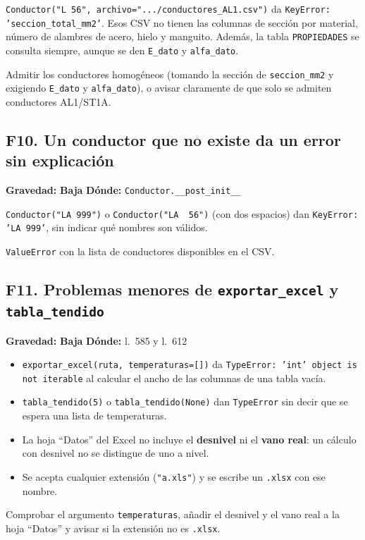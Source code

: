 \documentclass[11pt,a4paper]{article}
\newcommand{\baja}{\textcolor{baja}{\textbf{Baja}}}
\newcommand{\code}[1]{\texttt{#1}}
\newcommand{\fallo}[4]{%
  \subsection[#1. #2]{#1. #2}
  \noindent\textbf{Gravedad:} #3 \quad \textbf{Dónde:} #4\par\medskip}
\begin{document}
\code{Conductor("L 56", archivo=".../conductores\_AL1.csv")} da \code{KeyError: 'seccion\_total\_mm2'}. Esos CSV no tienen las columnas de sección por material, número de alambres de acero, hielo y manguito. Además, la tabla \code{PROPIEDADES} se consulta siempre, aunque se den \code{E\_dato} y \code{alfa\_dato}.

\begin{arreglo}
Admitir los conductores homogéneos (tomando la sección de \code{seccion\_mm2} y exigiendo \code{E\_dato} y \code{alfa\_dato}), o avisar claramente de que solo se admiten conductores AL1/ST1A.
\end{arreglo}

\fallo{F10}{Un conductor que no existe da un error sin explicación}{\baja}{\code{Conductor.\_\_post\_init\_\_}}

\code{Conductor("LA 999")} o \code{Conductor("LA~~56")} (con dos espacios) dan \code{KeyError: 'LA 999'}, sin indicar qué nombres son válidos.

\begin{arreglo}
\code{ValueError} con la lista de conductores disponibles en el CSV.
\end{arreglo}

\fallo{F11}{Problemas menores de \code{exportar\_excel} y \code{tabla\_tendido}}{\baja}{l.~585 y l.~612}

\begin{itemize}[leftmargin=1.5em]
  \item \code{exportar\_excel(ruta, temperaturas=[])} da \code{TypeError: 'int' object is not iterable} al calcular el ancho de las columnas de una tabla vacía.
  \item \code{tabla\_tendido(5)} o \code{tabla\_tendido(None)} dan \code{TypeError} sin decir que se espera una lista de temperaturas.
  \item La hoja ``Datos'' del Excel no incluye el \textbf{desnivel} ni el \textbf{vano real}: un cálculo con desnivel no se distingue de uno a nivel.
  \item Se acepta cualquier extensión (\code{"a.xls"}) y se escribe un \code{.xlsx} con ese nombre.
\end{itemize}

\begin{arreglo}
Comprobar el argumento \code{temperaturas}, añadir el desnivel y el vano real a la hoja ``Datos'' y avisar si la extensión no es \code{.xlsx}.
\end{arreglo}
\end{document}
